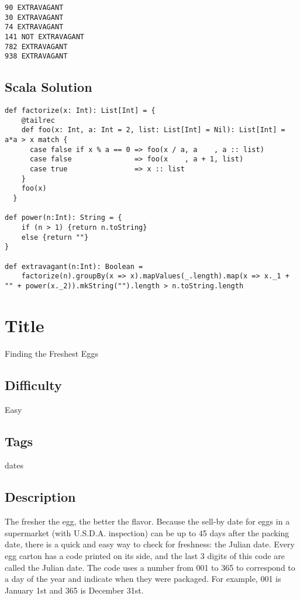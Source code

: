 \begin{verbatim}
90 EXTRAVAGANT
30 EXTRAVAGANT
74 EXTRAVAGANT
141 NOT EXTRAVAGANT
782 EXTRAVAGANT
938 EXTRAVAGANT
\end{verbatim}

\subsection{Scala Solution}\label{scala-solution-15}

\begin{verbatim}
def factorize(x: Int): List[Int] = {
    @tailrec
    def foo(x: Int, a: Int = 2, list: List[Int] = Nil): List[Int] = a*a > x match {
      case false if x % a == 0 => foo(x / a, a    , a :: list)
      case false               => foo(x    , a + 1, list)
      case true                => x :: list
    }
    foo(x)
  }

def power(n:Int): String = {
    if (n > 1) {return n.toString}
    else {return ""}
}

def extravagant(n:Int): Boolean = 
    factorize(n).groupBy(x => x).mapValues(_.length).map(x => x._1 + "" + power(x._2)).mkString("").length > n.toString.length
\end{verbatim}

\section{Title}\label{title-25}

Finding the Freshest Eggs

\subsection{Difficulty}\label{difficulty-24}

Easy

\subsection{Tags}\label{tags-25}

dates

\subsection{Description}\label{description-25}

The fresher the egg, the better the flavor. Because the sell-by date for
eggs in a supermarket (with U.S.D.A. inspection) can be up to 45 days
after the packing date, there is a quick and easy way to check for
freshness: the Julian date. Every egg carton has a code printed on its
side, and the last 3 digits of this code are called the Julian date. The
code uses a number from 001 to 365 to correspond to a day of the year
and indicate when they were packaged. For example, 001 is January 1st
and 365 is December 31st.


